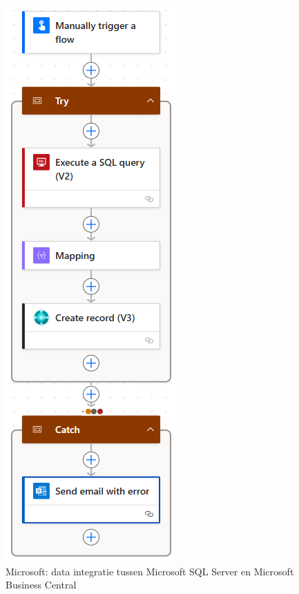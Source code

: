 \begin{figure}[H]
    \centering
    \includegraphics[]{../bachproef/images/Microsoft_Database_BusinessCentral.png}
    \caption{Microsoft: data integratie tussen Microsoft SQL Server en Microsoft Business Central}
\end{figure}